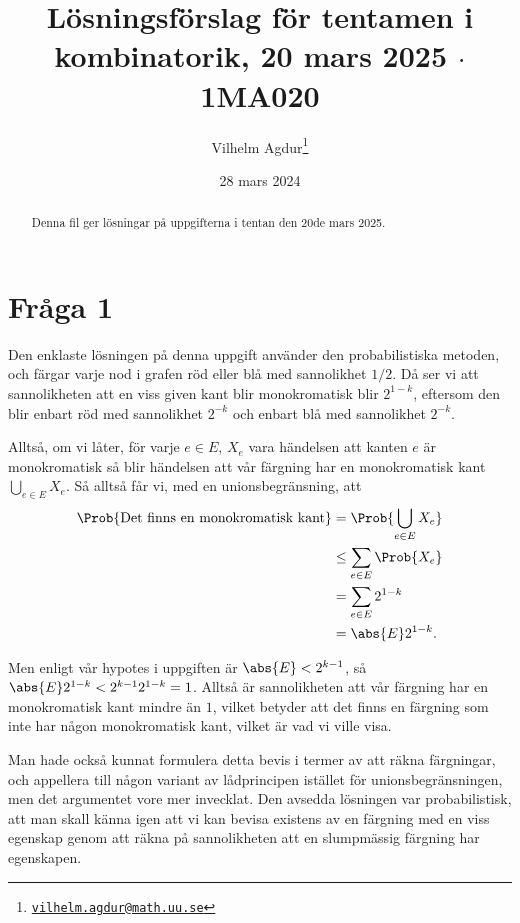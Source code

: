 \documentclass[nobib]{tufte-handout}
\title{Lösningsförslag för tentamen i kombinatorik, 20 mars 2025 $\cdot$ 1MA020}
\author[Vilhelm Agdur]{Vilhelm Agdur\thanks{\href{mailto:vilhelm.agdur@math.uu.se}{\nolinkurl{vilhelm.agdur@math.uu.se}}}}
\date{28 mars 2024}
\begin{document}

\maketitle%

\begin{abstract}
\noindent

Denna fil ger lösningar på uppgifterna i tentan den 20de mars 2025.

\end{abstract}

\section{Fråga 1}

Den enklaste lösningen på denna uppgift använder den probabilistiska metoden, och färgar varje nod i grafen röd eller blå med sannolikhet $1/2$. Då ser vi att sannolikheten att en viss given kant blir monokromatisk blir $2^{1-k}$, eftersom den blir enbart röd med sannolikhet $2^{-k}$ och enbart blå med sannolikhet $2^{-k}$.

Alltså, om vi låter, för varje $e \in E$, $X_e$ vara händelsen att kanten $e$ är monokromatisk så blir händelsen att vår färgning har en monokromatisk kant $\bigcup_{e \in E} X_e$. Så alltså får vi, med en unionsbegränsning, att
\begin{align*}
\Prob{\text{Det finns en monokromatisk kant}} 
&= \Prob{\bigcup_{e \in E} X_e} \\
&\leq \sum_{e \in E} \Prob{X_e} \\
&= \sum_{e \in E} 2^{1-k} \\
&= \abs{E}2^{1-k}.
\end{align*}

Men enligt vår hypotes i uppgiften är $\abs{E} < 2^{k-1}$, så $\abs{E}2^{1-k} < 2^{k-1}2^{1-k} = 1$. Alltså är sannolikheten att vår färgning har en monokromatisk kant mindre än $1$, vilket betyder att det finns en färgning som inte har någon monokromatisk kant, vilket är vad vi ville visa.

Man hade också kunnat formulera detta bevis i termer av att räkna färgningar, och appellera till någon variant av lådprincipen istället för unionsbegränsningen, men det argumentet vore mer invecklat. Den avsedda lösningen var probabilistisk, att man skall känna igen att vi kan bevisa existens av en färgning med en viss egenskap genom att räkna på sannolikheten att en slumpmässig färgning har egenskapen.
\end{document}
